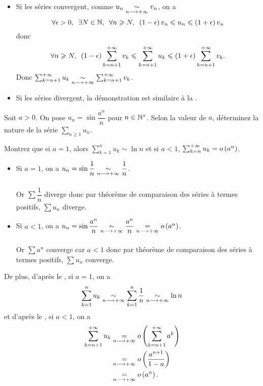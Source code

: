 \begin{dem}
\begin{itemize}
    \item Si les séries convergent, comme \(u_n\underset{n\longrightarrow+\infty}{\sim}v_n\), on a \[\quantifs{\forall\epsilon>0;\exists N\in\N;\forall n\geq N}\paren{1-\epsilon}v_n\leq u_n\leq\paren{1+\epsilon}v_n\] donc \[\quantifs{\forall n\geq N}\paren{1-\epsilon}\sum_{k=n+1}^{\pinf}v_k\leq\sum_{k=n+1}^{\pinf}u_k\leq\paren{1+\epsilon}\sum_{k=n+1}^{\pinf}v_k.\] Donc \(\sum_{k=n+1}^{+\infty}u_k\underset{n\longrightarrow+\infty}{\sim}\sum_{k=n+1}^{+\infty}v_k\). \\
    \item Si les séries divergent, la démonstration est similaire à la .
\end{itemize}
\end{dem}

\begin{exo}
Soit \(a>0\). On pose \(u_n=\sin\dfrac{a^n}{n}\) pour \(n\in\mathbb{N}^*\). Selon la valeur de \(a\), déterminez la nature de la série \(\sum_{n\geq1}u_n\).

Montrez que si \(a=1\), alors \(\sum_{k=1}^nu_k\sim\ln n\) et si \(a<1\), \(\sum_{k=n}^{+\infty}u_k=o\left(a^n\right)\).
\end{exo}

\begin{corr}
\begin{itemize}
    \item Si \(a=1\), on a \(u_n=\sin\dfrac{1}{n}\underset{n\longrightarrow+\infty}{\sim}\dfrac{1}{n}\). \\\\ Or \(\sum\dfrac{1}{n}\) diverge donc par théorème de comparaison des séries à termes positifs, \(\sum u_n\) diverge. \\
    \item Si \(a<1\), on a \(u_n=\sin\dfrac{a^n}{n}\underset{n\longrightarrow+\infty}{\sim}\dfrac{a^n}{n}\underset{n\longrightarrow+\infty}{=}o\left(a^n\right)\). \\\\ Or \(\sum a^n\) converge car \(a<1\) donc par théorème de comparaison des séries à termes positifs, \(\sum u_n\) converge.
\end{itemize}

De plus, d'après le , si \(a=1\), on a \[\sum_{k=1}^nu_k\underset{n\longrightarrow+\infty}{\sim}\sum_{k=1}^n\dfrac{1}{n}\underset{n\longrightarrow+\infty}{\sim}\ln n\] et d'après le , si \(a<1\), on a \[\begin{aligned}
\sum_{k=n+1}^{+\infty}u_k&\underset{n\longrightarrow+\infty}{=}o\left(\sum_{k=n+1}^{+\infty}a^k\right) \\
&\underset{n\longrightarrow+\infty}{=}o\left(\dfrac{a^{n+1}}{1-a}\right) \\
&\underset{n\longrightarrow+\infty}{=}o\left(a^n\right).
\end{aligned}\]
\end{corr}

